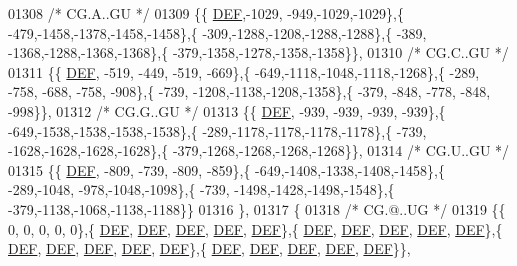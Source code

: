 \begin{DoxyCode}
01308 \textcolor{comment}{/* CG.A..GU */}
01309 \{\{  \mbox{\hyperlink{1_88_84__epars_8h_a397419fc12b37ed479c8abb9d444d843}{DEF}},-1029, -949,-1029,-1029\},\{ -479,-1458,-1378,-1458,-1458\},\{ -309,-1288,-1208,-1288,-1288\},\{ -389,
      -1368,-1288,-1368,-1368\},\{ -379,-1358,-1278,-1358,-1358\}\},
01310 \textcolor{comment}{/* CG.C..GU */}
01311 \{\{  \mbox{\hyperlink{1_88_84__epars_8h_a397419fc12b37ed479c8abb9d444d843}{DEF}}, -519, -449, -519, -669\},\{ -649,-1118,-1048,-1118,-1268\},\{ -289, -758, -688, -758, -908\},\{ -739,
      -1208,-1138,-1208,-1358\},\{ -379, -848, -778, -848, -998\}\},
01312 \textcolor{comment}{/* CG.G..GU */}
01313 \{\{  \mbox{\hyperlink{1_88_84__epars_8h_a397419fc12b37ed479c8abb9d444d843}{DEF}}, -939, -939, -939, -939\},\{ -649,-1538,-1538,-1538,-1538\},\{ -289,-1178,-1178,-1178,-1178\},\{ -739,
      -1628,-1628,-1628,-1628\},\{ -379,-1268,-1268,-1268,-1268\}\},
01314 \textcolor{comment}{/* CG.U..GU */}
01315 \{\{  \mbox{\hyperlink{1_88_84__epars_8h_a397419fc12b37ed479c8abb9d444d843}{DEF}}, -809, -739, -809, -859\},\{ -649,-1408,-1338,-1408,-1458\},\{ -289,-1048, -978,-1048,-1098\},\{ -739,
      -1498,-1428,-1498,-1548\},\{ -379,-1138,-1068,-1138,-1188\}\}
01316 \},
01317 \{
01318 \textcolor{comment}{/* CG.@..UG */}
01319 \{\{    0,    0,    0,    0,    0\},\{  \mbox{\hyperlink{1_88_84__epars_8h_a397419fc12b37ed479c8abb9d444d843}{DEF}},  \mbox{\hyperlink{1_88_84__epars_8h_a397419fc12b37ed479c8abb9d444d843}{DEF}},  \mbox{\hyperlink{1_88_84__epars_8h_a397419fc12b37ed479c8abb9d444d843}{DEF}},  \mbox{\hyperlink{1_88_84__epars_8h_a397419fc12b37ed479c8abb9d444d843}{DEF}},  \mbox{\hyperlink{1_88_84__epars_8h_a397419fc12b37ed479c8abb9d444d843}{DEF}}\},\{  
      \mbox{\hyperlink{1_88_84__epars_8h_a397419fc12b37ed479c8abb9d444d843}{DEF}},  \mbox{\hyperlink{1_88_84__epars_8h_a397419fc12b37ed479c8abb9d444d843}{DEF}},  \mbox{\hyperlink{1_88_84__epars_8h_a397419fc12b37ed479c8abb9d444d843}{DEF}},  \mbox{\hyperlink{1_88_84__epars_8h_a397419fc12b37ed479c8abb9d444d843}{DEF}},  \mbox{\hyperlink{1_88_84__epars_8h_a397419fc12b37ed479c8abb9d444d843}{DEF}}\},\{  \mbox{\hyperlink{1_88_84__epars_8h_a397419fc12b37ed479c8abb9d444d843}{DEF}},  \mbox{\hyperlink{1_88_84__epars_8h_a397419fc12b37ed479c8abb9d444d843}{DEF}},  \mbox{\hyperlink{1_88_84__epars_8h_a397419fc12b37ed479c8abb9d444d843}{DEF}},  \mbox{\hyperlink{1_88_84__epars_8h_a397419fc12b37ed479c8abb9d444d843}{DEF}},  
      \mbox{\hyperlink{1_88_84__epars_8h_a397419fc12b37ed479c8abb9d444d843}{DEF}}\},\{  \mbox{\hyperlink{1_88_84__epars_8h_a397419fc12b37ed479c8abb9d444d843}{DEF}},  \mbox{\hyperlink{1_88_84__epars_8h_a397419fc12b37ed479c8abb9d444d843}{DEF}},  \mbox{\hyperlink{1_88_84__epars_8h_a397419fc12b37ed479c8abb9d444d843}{DEF}},  \mbox{\hyperlink{1_88_84__epars_8h_a397419fc12b37ed479c8abb9d444d843}{DEF}},  \mbox{\hyperlink{1_88_84__epars_8h_a397419fc12b37ed479c8abb9d444d843}{DEF}}\}\},

\end{DoxyCode}
